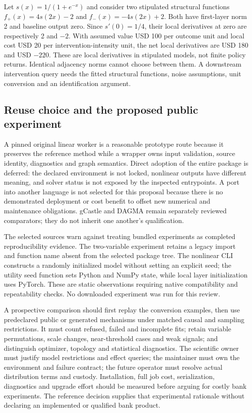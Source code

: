Let $s(x)=1/(1+e^{-x})$ and consider two stipulated structural functions
$f_+(x)=4s(2x)-2$ and $f_-(x)=-4s(2x)+2$.
Both have first-layer norm 2 and baseline output zero. Since $s'(0)=1/4$,
their local derivatives at zero are respectively 2 and $-2$.
With assumed value USD 100 per outcome unit and local cost USD 20 per
intervention-intensity unit, the net local derivatives are USD 180 and
USD $-220$. These are local derivatives in stipulated models, not finite
policy returns. Identical adjacency norms cannot choose between them.
A downstream intervention query needs the fitted structural functions,
noise assumptions, unit conversion and an identification argument.
\citep{exec23_notears_reference}

\subsection{Reuse choice and the proposed public experiment}
\label{exec23:notears-choice}
A pinned original linear worker is a reasonable prototype route because it
preserves the reference method while a wrapper owns input validation, source
identity, diagnostics and graph semantics. Direct adoption of the entire
package is deferred: the declared environment is not locked, nonlinear outputs
have different meaning, and solver status is not exposed by the inspected
entrypoints. A port into another language is not selected for this proposal
because there is no demonstrated deployment or cost benefit to offset new
numerical and maintenance obligations. gCastle and DAGMA remain separately
reviewed comparators; they do not inherit one another's qualification.
\citep{exec23_notears_source,exec20_gcastle_source,exec16_dagma_primary}

The selected sources warn against treating bundled experiments as completed
reproducibility evidence. The two-variable experiment retains a legacy import
and function name absent from the selected package tree. The nonlinear CLI
constructs a randomly initialized model without setting an explicit seed;
the utility seed function sets Python and NumPy state, while local layer
initialization uses PyTorch. These are static observations requiring native
compatibility and repeatability checks. No downloaded experiment was run
for this review.~\citep{exec23_notears_source}

A prospective comparison should first replay the conversion examples, then
use predeclared public or generated mechanisms under matched causal and
sampling restrictions. It must count refused, failed and incomplete fits;
retain variable permutations, scale changes, near-threshold cases and weak
signals; and distinguish optimizer, topology and statistical diagnostics.
The scientific owner must justify model restrictions and effect queries; the
maintainer must own the environment and failure contract; the future operator
must resolve actual distribution terms and custody. Installation, full job
cost, serialization, diagnostics and upgrade effort should be measured before
arguing for costly bank experiments. The reference decision supplies that
experimental rationale without declaring an implemented or qualified bank
product.~\citep{exec23_notears_source,exec23_notears_reference}


